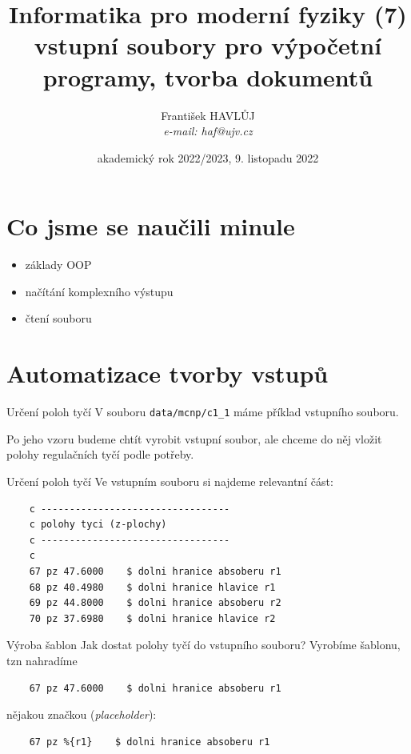 \documentclass{beamer}
\title[IMF (7)]{Informatika pro moderní fyziky (7)\\vstupní soubory pro výpočetní programy, tvorba dokumentů}
\author[Franti\v{s}ek HAVL\r{U}J, ORF ÚJV Řež]{Franti\v{s}ek HAVL\r{U}J\\{\scriptsize \emph{e-mail: haf@ujv.cz}}}
\date{akademický rok 2022/2023, 9. listopadu 2022}
\institute[ORF ÚJV Řež]
{ÚJV Řež\\oddělení Reaktorové fyziky a podpory palivového cyklu}
\begin{document}
\begin{frame}
  \titlepage
\end{frame}

\begin{frame}
  \tableofcontents
\end{frame}

\section{Co jsme se naučili minule}

\begin{frame}{}
  \begin{itemize}
    \item základy OOP
    \item načítání komplexního výstupu
    \item čtení souboru
  \end{itemize}
\end{frame}

\section{Automatizace tvorby vstupů}


\begin{frame}[fragile]{Určení poloh tyčí}
  V souboru \texttt{data/mcnp/c1\_1} máme příklad vstupního souboru.

  Po jeho vzoru budeme chtít vyrobit vstupní soubor, ale chceme do něj vložit polohy regulačních tyčí podle potřeby.
\end{frame}

\begin{frame}[fragile]{Určení poloh tyčí}
  Ve vstupním souboru si najdeme relevantní část:
  \scriptsize
  \begin{verbatim}
    c ---------------------------------
    c polohy tyci (z-plochy)
    c ---------------------------------
    c
    67 pz 47.6000    $ dolni hranice absoberu r1
    68 pz 40.4980    $ dolni hranice hlavice r1
    69 pz 44.8000    $ dolni hranice absoberu r2
    70 pz 37.6980    $ dolni hranice hlavice r2
  \end{verbatim}
\end{frame}

\begin{frame}[fragile]{Výroba šablon}
  Jak dostat polohy tyčí do vstupního souboru? Vyrobíme šablonu, tzn nahradíme
  \begin{verbatim}
    67 pz 47.6000    $ dolni hranice absoberu r1
  \end{verbatim}
  \pause
  nějakou značkou (\emph{placeholder}):
  \begin{verbatim}
    67 pz %{r1}    $ dolni hranice absoberu r1
  \end{verbatim}
\end{frame}
\end{document}
